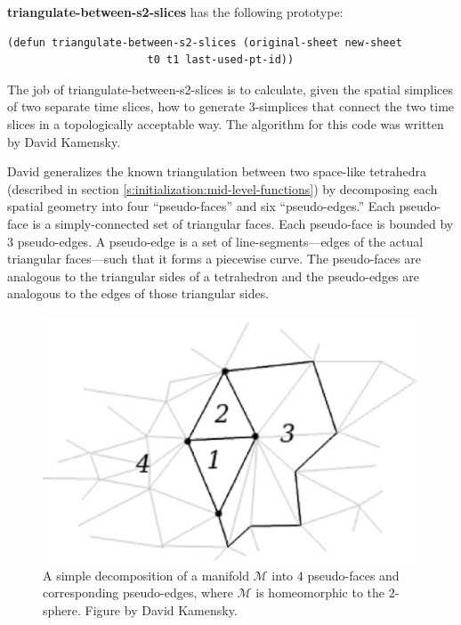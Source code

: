 \message{ !name(programmers_guide.tex)}\documentclass[12pt]{article}
\begin{document}
\textbf{triangulate-between-s2-slices} has the following prototype:
\begin{lstlisting}
(defun triangulate-between-s2-slices (original-sheet new-sheet 
				      t0 t1 last-used-pt-id))
\end{lstlisting}

The job of triangulate-between-s2-slices is to calculate, given the
spatial simplices of two separate time slices, how to generate
3-simplices that connect the two time slices in a topologically
acceptable way. The algorithm for this code was written by David
Kamensky. 

David generalizes the known triangulation between two space-like
tetrahedra (described in section
\ref{s:initialization:mid-level-functions}) by decomposing each
spatial geometry into four ``pseudo-faces'' and six ``pseudo-edges.''
Each pseudo-face is a simply-connected set of triangular faces. Each
pseudo-face is bounded by 3 pseudo-edges. A pseudo-edge is a set of
line-segments---edges of the actual triangular faces---such that it
forms a piecewise curve. The pseudo-faces are analogous to the
triangular sides of a tetrahedron and the pseudo-edges are analogous
to the edges of those triangular sides.

\begin{figure}[htb]
\begin{center}
\leavevmode
\includegraphics[width=\textwidth]{pseudo-face_pseudo-edge_decomposition.png}
\caption{A simple decomposition of a manifold $\mathcal{M}$ into 4
  pseudo-faces and corresponding pseudo-edges, where $\mathcal{M}$ is
  homeomorphic to the 2-sphere. Figure by David Kamensky.}
\label{fig:pseudo-face-decomposition}
\end{center}
\end{figure}
\end{document}
